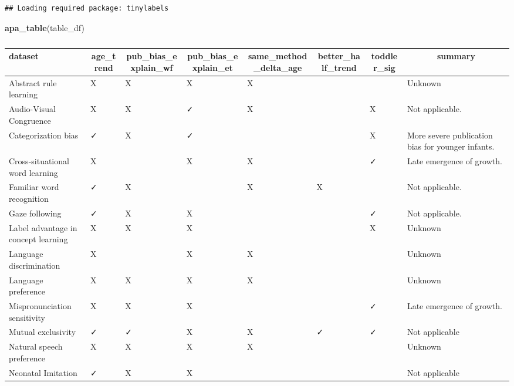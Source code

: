 \documentclass[
]{article}
\newenvironment{Shaded}{\begin{snugshade}}{\end{snugshade}}
\newcommand{\FunctionTok}[1]{\textcolor[rgb]{0.13,0.29,0.53}{\textbf{#1}}}
\newcommand{\NormalTok}[1]{#1}
\begin{document}
\begin{verbatim}
## Loading required package: tinylabels
\end{verbatim}

\begin{Shaded}
\begin{Highlighting}[]
\FunctionTok{apa\_table}\NormalTok{(table\_df)}
\end{Highlighting}
\end{Shaded}

\begin{table}[tbp]

\begin{center}
\begin{threeparttable}

\caption{\label{tab:unnamed-chunk-8}}

\begin{tabular}{llllllll}
\toprule
dataset & \multicolumn{1}{c}{age\_trend} & \multicolumn{1}{c}{pub\_bias\_explain\_wf} & \multicolumn{1}{c}{pub\_bias\_explain\_et} & \multicolumn{1}{c}{same\_method\_delta\_age} & \multicolumn{1}{c}{better\_half\_trend} & \multicolumn{1}{c}{toddler\_sig} & \multicolumn{1}{c}{summary}\\
\midrule
Abstract rule learning & X & X & X & X &  &  & Unknown\\
Audio-Visual Congruence & X & X & ✓ & X &  & X & Not applicable.\\
Categorization bias & ✓ & X & ✓ &  &  & X & More severe publication bias for younger infants.\\
Cross-situational word learning & X &  & X & X &  & ✓ & Late emergence of growth.\\
Familiar word recognition & ✓ & X &  & X & X &  & Not applicable.\\
Gaze following & ✓ & X & X &  &  & ✓ & Not applicable.\\
Label advantage in concept learning & X & X & X &  &  & X & Unknown\\
Language discrimination & X &  & X & X &  &  & Unknown\\
Language preference & X & X & X & X &  &  & Unknown\\
Mispronunciation sensitivity & X & X & X &  &  & ✓ & Late emergence of growth.\\
Mutual exclusivity & ✓ & ✓ & X & X & ✓ & ✓ & Not applicable\\
Natural speech preference & X & X & X & X &  &  & Unknown\\
Neonatal Imitation & ✓ & X & X &  &  &  & Not applicable\\

\end{tabular}
\end{threeparttable}
\end{center}
\end{table}
\end{document}
